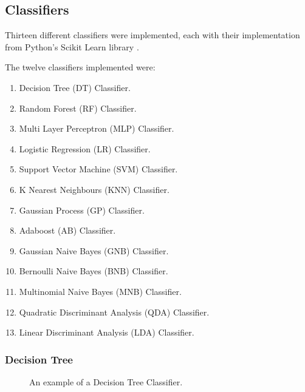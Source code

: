 \subsection{Classifiers}

Thirteen different classifiers were implemented, each with their implementation from Python's Scikit Learn library \cite{scikit-learn}.

The twelve classifiers implemented were:
\begin{enumerate}
    \item Decision Tree (DT) Classifier.
    \item Random Forest (RF) Classifier.
    \item Multi Layer Perceptron (MLP) Classifier.
    \item Logistic Regression (LR) Classifier.
    \item Support Vector Machine (SVM) Classifier.
    \item K Nearest Neighbours (KNN) Classifier.
    \item Gaussian Process (GP) Classifier.
    \item Adaboost (AB) Classifier.
    \item Gaussian Naive Bayes (GNB) Classifier.
    \item Bernoulli Naive Bayes (BNB) Classifier.
    \item Multinomial Naive Bayes (MNB) Classifier.
    \item Quadratic Discriminant Analysis (QDA) Classifier.
    \item Linear Discriminant Analysis (LDA) Classifier.
\end{enumerate}

\subsubsection*{Decision Tree}

\begin{figure}[h!]
\centering
{}
\caption{\label{fig:decisiontree} An example of a Decision Tree Classifier.}
\end{figure}

